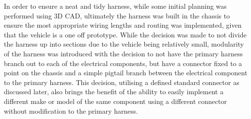 In order to ensure a neat and tidy harness, while some initial planning was performed using 3D CAD, ultimately the harness was built in the chassis to ensure the most appropriate wiring lengths and routing was implemented, given that the vehicle is a one off prototype.  While the decision was made to not divide the harness up into sections due to the vehicle being relatively small, modularity of the harness was introduced with the decision to not have the primary harness branch out to each of the electrical components, but have a connector fixed to a point on the chassis and a simple pigtail branch between the electrical component to the primary harness.  This decision, utilising a defined standard connector as discussed later, also brings the benefit of the ability to easily implement a different make or model of the same component using a different connector without modification to the primary harness.

